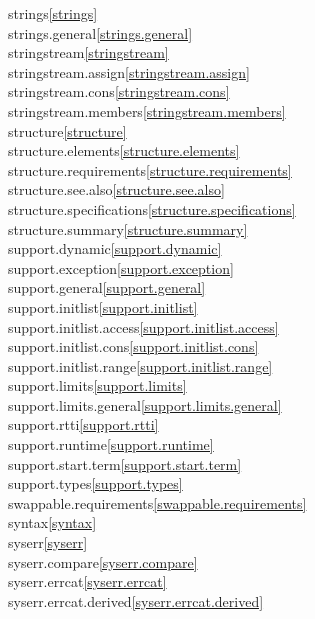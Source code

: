 \begin{multicols}{2}
strings\quad\ref{strings}\\
strings.general\quad\ref{strings.general}\\
stringstream\quad\ref{stringstream}\\
stringstream.assign\quad\ref{stringstream.assign}\\
stringstream.cons\quad\ref{stringstream.cons}\\
stringstream.members\quad\ref{stringstream.members}\\
structure\quad\ref{structure}\\
structure.elements\quad\ref{structure.elements}\\
structure.requirements\quad\ref{structure.requirements}\\
structure.see.also\quad\ref{structure.see.also}\\
structure.specifications\quad\ref{structure.specifications}\\
structure.summary\quad\ref{structure.summary}\\
support.dynamic\quad\ref{support.dynamic}\\
support.exception\quad\ref{support.exception}\\
support.general\quad\ref{support.general}\\
support.initlist\quad\ref{support.initlist}\\
support.initlist.access\quad\ref{support.initlist.access}\\
support.initlist.cons\quad\ref{support.initlist.cons}\\
support.initlist.range\quad\ref{support.initlist.range}\\
support.limits\quad\ref{support.limits}\\
support.limits.general\quad\ref{support.limits.general}\\
support.rtti\quad\ref{support.rtti}\\
support.runtime\quad\ref{support.runtime}\\
support.start.term\quad\ref{support.start.term}\\
support.types\quad\ref{support.types}\\
swappable.requirements\quad\ref{swappable.requirements}\\
syntax\quad\ref{syntax}\\
syserr\quad\ref{syserr}\\
syserr.compare\quad\ref{syserr.compare}\\
syserr.errcat\quad\ref{syserr.errcat}\\
syserr.errcat.derived\quad\ref{syserr.errcat.derived}\\

\end{multicols}
